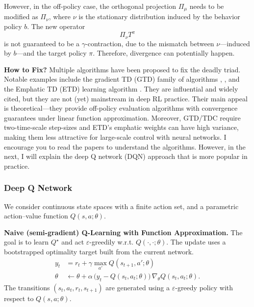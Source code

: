 \documentclass[
]{book}
\theoremstyle{definition}
\theoremstyle{definition}
\theoremstyle{definition}
\theoremstyle{definition}
\theoremstyle{remark}
\begin{document}
However, in the off-policy case, the orthogonal projection \(\Pi_\mu\) needs to be modified as \(\Pi_{\nu}\), where \(\nu\) is the stationary distribution induced by the behavior policy \(b\). The new operator
\[
\Pi_{\nu} T^\pi
\]
is not guaranteed to be a \(\gamma\)-contraction, due to the mismatch between \(\nu\)---induced by \(b\)---and the target policy \(\pi\). Therefore, divergence can potentially happen.

\textbf{How to Fix?} Multiple algorithms have been proposed to fix the deadly triad. Notable examples include the gradient TD (GTD) family of algorithms \citep{sutton2008convergent}, \citep{sutton2009fast}, and the Emphatic TD (ETD) learning algorithm \citep{mahmood2015emphatic}. They are influential and widely cited, but they are not (yet) mainstream in deep RL practice. Their main appeal is theoretical---they provide off-policy evaluation algorithms with convergence guarantees under linear function approximation. Moreover, GTD/TDC require two-time-scale step-sizes and ETD's emphatic weights can have high variance, making them less attractive for large-scale control with neural networks. I encourage you to read the papers to understand the algorithms. However, in the next, I will explain the deep Q network (DQN) approach that is more popular in practice.

\subsubsection{Deep Q Network}\label{deep-q-network}

We consider continuous state spaces with a finite action set, and a parametric action--value function \(Q(s,a; \theta)\).

\textbf{Naive (semi-gradient) Q-Learning with Function Approximation.} The goal is to learn \(Q^\star\) and act \(\varepsilon\)-greedily w.r.t. \(Q(\cdot,\cdot; \theta)\). The update uses a bootstrapped optimality target built from the current network.
\begin{equation}
\begin{split}
y_t & = r_t + \gamma \max_{a'} Q(s_{t+1}, a';\theta) \\
\theta & \leftarrow \theta + \alpha \,\big(y_t - Q(s_t,a_t;\theta)\big)\,\nabla_\theta Q(s_t,a_t; \theta).
\end{split}
\label{eq:naiveQLearningFA}
\end{equation}
The transitions \((s_t,a_t,r_t,s_{t+1})\) are generated using a \(\varepsilon\)-greedy policy with respect to \(Q(s,a;\theta)\).
\end{document}
